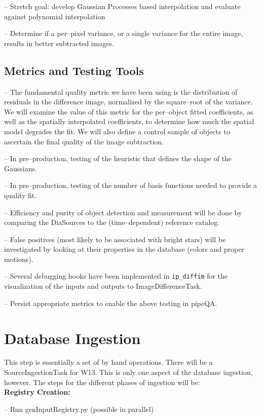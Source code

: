 \documentclass[prd, nofootinbib, floatfix, 11pt,tightenlines,times]{article}
\begin{document}
-- Stretch goal: develop Gaussian Processes based interpolation and
evaluate against polynomial interpolation

-- Determine if a per--pixel variance, or a single variance for the entire
image, results in better subtracted images.

\subsection{Metrics and Testing Tools}

-- The fundamental quality metric we have been using is the
distribution of residuals in the difference image, normalized by the
square--root of the variance.  We will examine the value of this
metric for the per--object fitted coefficients, as well as the
spatially interpolated coefficients, to determine how much the spatial
model degrades the fit.  We will also define a control sample of
objects to ascertain the final quality of the image subtraction.

-- In pre--production, testing of the heuristic that defines the shape
of the Gaussians.

-- In pre--production, testing of the number of basis functions needed
to provide a quality fit.  

-- Efficiency and purity of object detection and measurement will be
done by comparing the DiaSources to the (time--dependent) reference
catalog.

-- False positives (most likely to be associated with bright stars)
will be investigated by looking at their properties in the database
(colors and proper motions).

-- Several debugging hooks have been implemented in {\tt ip\_diffim} for
the visualization of the inputs and outputs to ImageDifferenceTask.

-- Persist appropriate metrics to enable the above testing in pipeQA.


\section{Database Ingestion} 
This step is essentially a set of by hand operations.  
There will be a SourceIngestionTask for W13.  This is only one aspect of the
database ingestion, however.  The steps for the different phases of ingestion will be:\\
{\bf Registry Creation:}

-- Run genInputRegistry.py (possible in parallel)
\end{document}
